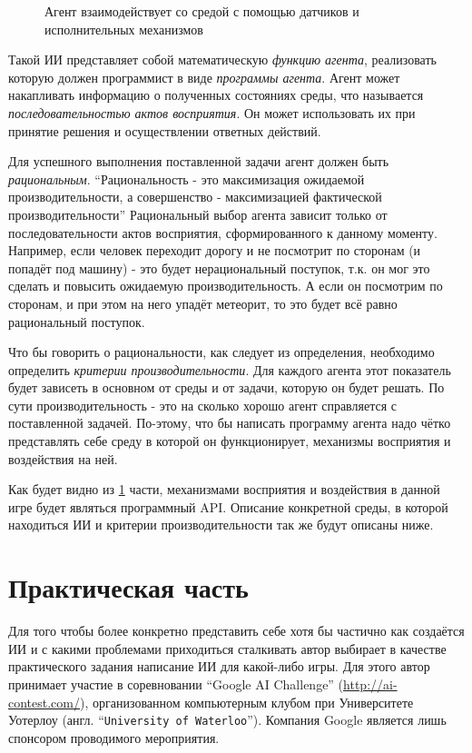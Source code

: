 \documentclass[12pt]{report}
\begin{document}
\begin{figure}[h]
	\centering
	
	\caption{Агент взаимодействует со средой с помощью датчиков и исполнительных механизмов \citep{russell1995}}
	\label{fig:agent}
\end{figure}
Такой ИИ представляет собой математическую \emph{функцию агента}, реализовать которую должен программист в виде \emph{программы агента}. Агент может накапливать информацию о полученных состояниях среды, что называется \emph{последовательностью актов восприятия}. Он может использовать их при принятие решения и осуществлении ответных действий. 

Для успешного выполнения поставленной задачи агент должен быть \emph{рациональным}. ``Рациональность - это максимизация ожидаемой производительности, а совершенство - максимизацией фактической производительности'' \citep{russell1995} Рациональный выбор агента зависит только от последовательности актов восприятия, сформированного к данному моменту. Например, если человек переходит дорогу и не посмотрит по сторонам (и попадёт под машину) - это будет нерациональный поступок, т.к. он мог это сделать и повысить ожидаемую производительность. А если он посмотрим по сторонам, и при этом на него упадёт метеорит, то это будет всё равно рациональный поступок.\citep{russell1995} 

Что бы говорить о рациональности, как следует из определения, необходимо определить \emph{критерии производительности}. Для каждого агента этот показатель будет зависеть в основном от среды и от задачи, которую он будет решать. По сути производительность - это на сколько хорошо агент справляется с поставленной задачей. По-этому, что бы написать программу агента надо чётко представлять себе среду в которой он функционирует, механизмы восприятия и воздействия на ней. 

Как будет видно из \ref{chap:practice} части, механизмами восприятия и воздействия в данной игре будет являться программный API. Описание конкретной среды, в которой находиться ИИ и критерии производительности так же будут описаны ниже.


\chapter{Практическая часть}
\label{chap:practice}
\thispagestyle{fancy}
Для того чтобы более конкретно представить себе хотя бы частично как создаётся ИИ и с какими проблемами приходиться сталкивать автор выбирает в качестве практического задания написание ИИ для какой-либо игры. Для этого автор принимает участие в соревновании ``Google AI Challenge'' (\url{http://ai-contest.com/}), организованном компьютерным клубом при Университете Уотерлоу (англ. ``\texttt{University of Waterloo}''). Компания Google является лишь спонсором проводимого мероприятия. \citep{AIChallangeFAQ} 
\end{document}
